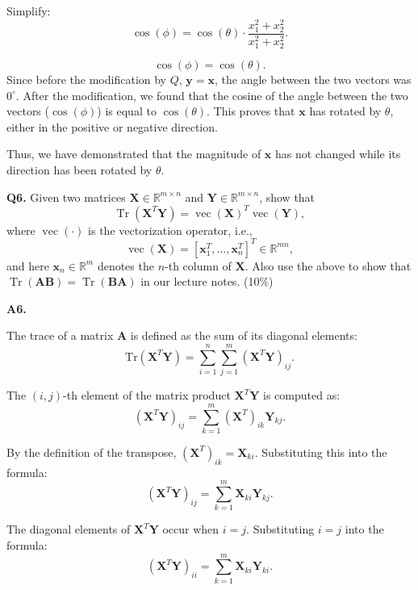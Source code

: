\documentclass[12pt]{article}
\newcommand{\bvec}[1]{\mathbf{#1}} %
\newcommand{\bmat}[1]{\mathbf{#1}} %
\begin{document}
Simplify:
\[
\cos(\phi) = \cos(\theta) \cdot \frac{x_1^2 + x_2^2}{x_1^2 + x_2^2}.
\]

\[
\cos(\phi) = \cos(\theta).
\]
Since before the modification by \( Q \), \(\bvec{y} = \bvec{x}\), the angle between the two vectors was \(0^\circ\). After the modification, we found that the cosine of the angle between the two vectors (\(\cos(\phi)\)) is equal to \(\cos(\theta)\). This proves that \(\bvec{x}\) has rotated by \(\theta\), either in the positive 
or negative direction.

\vspace{\baselineskip}

Thus, we have demonstrated that the magnitude of \(\bvec{x}\) has not changed while its 
direction has been rotated by \(\theta\).

\vspace{\baselineskip}
\hline
\vspace{\baselineskip}

\textbf{Q6.} Given two matrices \( \bmat{X} \in \mathbb{R}^{m \times n} \) and \( \bmat{Y} \in \mathbb{R}^{m \times n} \), show that
\[
\operatorname{Tr}(\bmat{X}^T \bmat{Y}) = \operatorname{vec}(\bmat{X})^T \operatorname{vec}(\bmat{Y}),
\]
where \( \operatorname{vec}(\cdot) \) is the vectorization operator, i.e.,
\[
\operatorname{vec}(\bmat{X}) = [\bvec{x}_1^T, \ldots, \bvec{x}_n^T]^T \in \mathbb{R}^{mn},
\]
and here \( \bvec{x}_n \in \mathbb{R}^m \) denotes the \( n \)-th column of \( \bmat{X} \). Also use the above to show that \( \operatorname{Tr}(\bmat{A} \bmat{B}) = \operatorname{Tr}(\bmat{B} \bmat{A}) \) in our lecture notes. \hfill (10\%)
\vspace{\baselineskip}

\textbf{A6.}

The trace of a matrix \( \mathbf{A} \) is defined as the sum of its diagonal elements:
\[
\text{Tr}(\mathbf{X}^T \mathbf{Y}) = \sum_{i=1}^n \sum_{j=1}^m (\mathbf{X}^T \mathbf{Y})_{ij}.
\]

The \( (i, j) \)-th element of the matrix product \( \mathbf{X}^T \mathbf{Y} \) is computed as:
\[
(\mathbf{X}^T \mathbf{Y})_{ij} = \sum_{k=1}^m (\mathbf{X}^T)_{ik} \mathbf{Y}_{kj}.
\]

By the definition of the transpose, \( (\mathbf{X}^T)_{ik} = \mathbf{X}_{ki} \). Substituting this into the formula:
\[
(\mathbf{X}^T \mathbf{Y})_{ij} = \sum_{k=1}^m \mathbf{X}_{ki} \mathbf{Y}_{kj}.
\]

The diagonal elements of \( \mathbf{X}^T \mathbf{Y} \) occur when \( i = j \). Substituting \( i = j \) into the formula:
\[
(\mathbf{X}^T \mathbf{Y})_{ii} = \sum_{k=1}^m \mathbf{X}_{ki} \mathbf{Y}_{ki}.
\]
\end{document}
